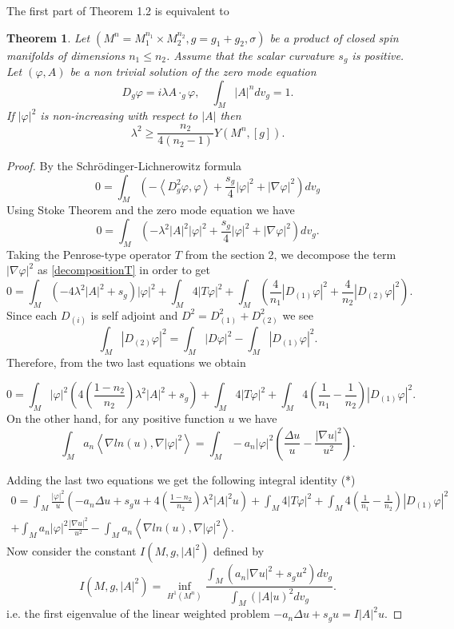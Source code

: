 \documentclass[11pt]{amsart}
\newtheorem{theorem}{Theorem}[section]
\theoremstyle{plain}
\numberwithin{equation}{section}
\theoremstyle{plain}
\begin{document}
The first part of Theorem 1.2 is equivalent to

\begin{theorem}
Let $(M^n=M_1^{n_1}\times M_2^{n_2},g=g_1+g_2,\sigma)$ be a product of closed spin manifolds of dimensions $n_1\leq n_2$. Assume that the scalar curvature $s_g$ is positive. Let $(\varphi,A)$ be a non trivial solution of the zero mode equation $$D_g\varphi=i\lambda A\cdot_g\varphi,\quad\int_M |A|^ndv_g=1. $$
If $|\varphi|^2$ is non-increasing with respect to $|A|$ then $$\lambda^2\geq \frac{n_2}{4(n_2-1)}Y(M^n,[g]).$$
\end{theorem}

\begin{proof}
By the Schrödinger-Lichnerowitz formula $$0=\int_M\left(- \left\langle D^2_g\varphi,\varphi\right\rangle+\frac{s_g}{4}|\varphi|^2+|\nabla \varphi|^2\right)dv_g$$
Using Stoke Theorem and the zero mode equation we have $$0=\int_M\left(- \lambda^2|A|^2|\varphi|^2+\frac{s_g}{4}|\varphi|^2+|\nabla \varphi|^2\right)dv_g.$$
Taking the Penrose-type operator $T$ from the section 2, we decompose the term $|\nabla\varphi|^2$ as \eqref{decompositionT} in order to get
$$0=\int_M\left( - 4\lambda^2|A|^2+s_g\right)|\varphi|^2+\int_M 4|T\varphi|^2+\int_M\left(\frac{4}{n_1}|D_{(1)}\varphi|^2+\frac{4}{n_2}|D_{(2)}\varphi|^2\right).$$
Since each $D_{(i)}$ is self adjoint and $D^2=D^2_{(1)}+D^2_{(2)}$ we see $$\int_M|D_{(2)}\varphi|^2=\int_M|D\varphi|^2-\int_M|D_{(1)}\varphi|^2.$$
Therefore, from the two last equations we obtain
 
$$0=\int_M |\varphi|^2\left(4\left(\frac{1-n_2}{n_2}\right)\lambda^2|A|^2+s_g\right)+\int_M 4|T\varphi|^2+\int_M 4\left( \frac{1}{n_1}-\frac{1}{n_2}\right)|D_{(1)}\varphi|^2.$$
On the other hand, for any positive function $u$ we have
$$\int_Ma_n\left\langle\nabla ln(u),\nabla |\varphi|^2\right\rangle=\int_M-a_n|\varphi|^2\left(\frac{\Delta u}{u}-\frac{|\nabla u|^2}{u^2}\right).$$

Adding the last two equations we get the following integral identity (*)
\begin{align*}
0=\int_M\frac{|\varphi|^2}{u}\left(-a_n\Delta u+s_gu+4\left(\frac{1-n_2}{n_2}\right)\lambda^2|A|^2u\right)+\int_M 4|T\varphi|^2+\int_M 4\left( \frac{1}{n_1}-\frac{1}{n_2}\right)|D_{(1)}\varphi|^2\\
+\int_M a_n|\varphi|^2\frac{|\nabla u|^2}{u^2}-\int_Ma_n\left\langle\nabla ln(u),\nabla |\varphi|^2\right\rangle.
\end{align*}
Now consider the constant $I(M,g,|A|^2)$ defined by $$I(M,g,|A|^2)=\inf_{H^1(M^n)}\frac{\int_M\left( a_n|\nabla u|^2+s_gu^2\right)dv_g}{\int_M (|A|u)^2dv_g}.$$
i.e. the first eigenvalue of the linear weighted problem $-a_n\Delta u+s_gu=I|A|^2u.$


\end{proof}
\end{document}
